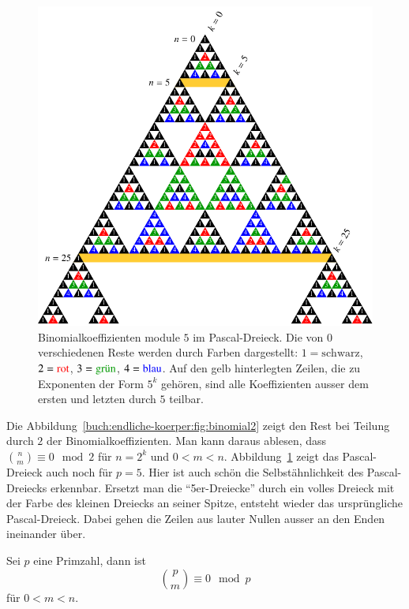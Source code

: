 \begin{figure}
\centering
\includegraphics{chapters/30-endlichekoerper/images/binomial5.pdf}
\caption{Binomialkoeffizienten module $5$ im Pascal-Dreieck.
Die von $0$ verschiedenen Reste werden durch Farben dargestellt:
$1=\text{schwarz}$,
$2=\text{\color{farbe2}rot}$,
$3=\text{\color{farbe3}grün}$,
$4=\text{\color{farbe4}blau}$.
Auf den gelb hinterlegten Zeilen, die zu Exponenten der Form $5^k$ gehören,
sind alle Koeffizienten ausser dem ersten und letzten durch $5$ teilbar.
\label{buch:endliche-koerper:fig:binomial5}}
\end{figure}
\egroup
Die Abbildung~\ref{buch:endliche-koerper:fig:binomial2} zeigt den
Rest bei Teilung durch $2$ der Binomialkoeffizienten.
Man kann daraus ablesen, dass $\binom{n}{m}\equiv 0\mod 2$ für $n=2^k$ 
und $0<m<n$.
Abbildung~\ref{buch:endliche-koerper:fig:binomial5} zeigt das Pascal-Dreieck
auch noch für $p=5$.
Hier ist auch schön die Selbstähnlichkeit des Pascal-Dreiecks erkennbar.
Ersetzt man die ``5er-Dreiecke'' durch ein volles Dreieck mit der Farbe
des kleinen Dreiecks an seiner Spitze, entsteht wieder das ursprüngliche
Pascal-Dreieck.
Dabei gehen die Zeilen aus lauter Nullen ausser an den Enden ineinander über.

\begin{satz}
\label{buch:endliche-koerper:satz:binom}
Sei $p$ eine Primzahl, dann ist
\[
\binom{p}{m} \equiv 0\mod p
\]
für $0<m<n$.
\end{satz}

